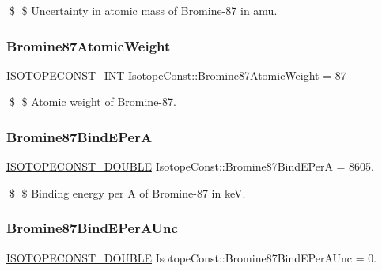 \$ \$ Uncertainty in atomic mass of Bromine-\/87 in amu. \mbox{\label{group___isotope_const-_bromine-_br87_gaad115d011fdae7c7b8e46ce5cae38f39}} 
\subsubsection{\texorpdfstring{Bromine87\+Atomic\+Weight}{Bromine87AtomicWeight}}
{\footnotesize\ttfamily \mbox{\hyperlink{group___isotope_const-_macros_ga5f18360b3e99483a35c32d789e62621c}{I\+S\+O\+T\+O\+P\+E\+C\+O\+N\+S\+T\+\_\+\+I\+NT}} Isotope\+Const\+::\+Bromine87\+Atomic\+Weight = 87}

\$ \$ Atomic weight of Bromine-\/87. \mbox{\label{group___isotope_const-_bromine-_br87_ga73b2bc99e2e14b42e12fca9534fe04b9}} 
\subsubsection{\texorpdfstring{Bromine87\+Bind\+E\+PerA}{Bromine87BindEPerA}}
{\footnotesize\ttfamily \mbox{\hyperlink{group___isotope_const-_macros_ga8f45a7272ce02c0b4c65c44636ed719a}{I\+S\+O\+T\+O\+P\+E\+C\+O\+N\+S\+T\+\_\+\+D\+O\+U\+B\+LE}} Isotope\+Const\+::\+Bromine87\+Bind\+E\+PerA = 8605.}

\$ \$ Binding energy per A of Bromine-\/87 in keV. \mbox{\label{group___isotope_const-_bromine-_br87_ga0f0df7ff631d5abf106b575c12bd4952}} 
\subsubsection{\texorpdfstring{Bromine87\+Bind\+E\+Per\+A\+Unc}{Bromine87BindEPerAUnc}}
{\footnotesize\ttfamily \mbox{\hyperlink{group___isotope_const-_macros_ga8f45a7272ce02c0b4c65c44636ed719a}{I\+S\+O\+T\+O\+P\+E\+C\+O\+N\+S\+T\+\_\+\+D\+O\+U\+B\+LE}} Isotope\+Const\+::\+Bromine87\+Bind\+E\+Per\+A\+Unc = 0.}

